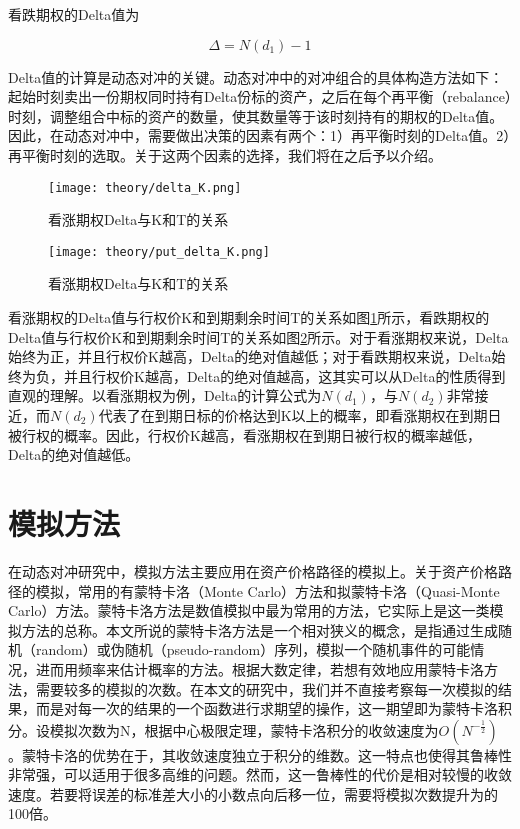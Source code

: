 看跌期权的Delta值为

\begin{equation}
  \Delta=N(d_1)-1
\end{equation}

Delta值的计算是动态对冲的关键。动态对冲中的对冲组合的具体构造方法如下：起始时刻卖出一份期权同时持有Delta份标的资产，之后在每个再平衡（rebalance）时刻，调整组合中标的资产的数量，使其数量等于该时刻持有的期权的Delta值。因此，在动态对冲中，需要做出决策的因素有两个：1）再平衡时刻的Delta值。2）再平衡时刻的选取。关于这两个因素的选择，我们将在之后予以介绍。

\begin{figure}[!htp]
  \centering
  \texttt{[image: theory/delta\_K.png]}
  \caption[这里将出现在插图索引中]
    {看涨期权Delta与K和T的关系}
  \label{fig:delta_k}
\end{figure}

\begin{figure}[!htp]
  \centering
  \texttt{[image: theory/put\_delta\_K.png]}
  \caption[这里将出现在插图索引中]
    {看涨期权Delta与K和T的关系}
  \label{fig:put_delta_k}
\end{figure}

看涨期权的Delta值与行权价K和到期剩余时间T的关系如图\ref{fig:delta_k}所示，看跌期权的Delta值与行权价K和到期剩余时间T的关系如图\ref{fig:put_delta_k}所示。对于看涨期权来说，Delta始终为正，并且行权价K越高，Delta的绝对值越低；对于看跌期权来说，Delta始终为负，并且行权价K越高，Delta的绝对值越高，这其实可以从Delta的性质得到直观的理解。以看涨期权为例，Delta的计算公式为$N(d_1)$，与$N(d_2)$非常接近，而$N(d_2)$代表了在到期日标的价格达到K以上的概率，即看涨期权在到期日被行权的概率。因此，行权价K越高，看涨期权在到期日被行权的概率越低，Delta的绝对值越低。


\section{模拟方法}

在动态对冲研究中，模拟方法主要应用在资产价格路径的模拟上。关于资产价格路径的模拟，常用的有蒙特卡洛（Monte Carlo）方法和拟蒙特卡洛（Quasi-Monte Carlo）方法。蒙特卡洛方法是数值模拟中最为常用的方法，它实际上是这一类模拟方法的总称。本文所说的蒙特卡洛方法是一个相对狭义的概念，是指通过生成随机（random）或伪随机（pseudo-random）序列，模拟一个随机事件的可能情况，进而用频率来估计概率的方法。根据大数定律，若想有效地应用蒙特卡洛方法，需要较多的模拟的次数。在本文的研究中，我们并不直接考察每一次模拟的结果，而是对每一次的结果的一个函数进行求期望的操作，这一期望即为蒙特卡洛积分。设模拟次数为N，根据中心极限定理，蒙特卡洛积分的收敛速度为$O(N^{-\frac{1}{2}})$。蒙特卡洛的优势在于，其收敛速度独立于积分的维数。这一特点也使得其鲁棒性非常强，可以适用于很多高维的问题。然而，这一鲁棒性的代价是相对较慢的收敛速度。若要将误差的标准差大小的小数点向后移一位，需要将模拟次数提升为的100倍。

